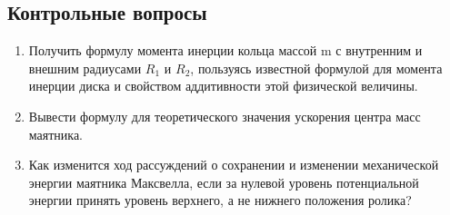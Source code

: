 \documentclass[a4paper, 12pt]{extarticle}
\begin{document}
\subsection{Контрольные вопросы}
\begin{enumerate}
\item Получить формулу момента инерции кольца массой m с внутренним и внешним радиусами $R_1$ и $R_2$, пользуясь известной формулой для момента инерции диска и свойством аддитивности этой физической величины. 
\item Вывести формулу для теоретического значения  ускорения центра масс маятника. 
\item Как изменится ход рассуждений о сохранении и изменении механической энергии маятника Максвелла, если за нулевой уровень потенциальной энергии принять уровень верхнего, а не нижнего положения ролика? 
\end{enumerate}
\end{document}
